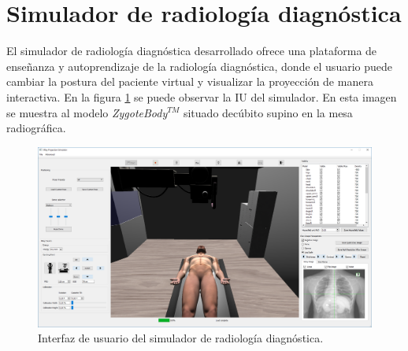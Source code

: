 \clearpage
\section{Simulador de radiología diagnóstica}
\label{result:xray}

El simulador de radiología diagnóstica desarrollado ofrece una plataforma de enseñanza y autoprendizaje de la radiología diagnóstica, donde el usuario puede cambiar la postura del paciente virtual y visualizar la proyección de manera interactiva. 
%
En la figura \ref{fig:simui} se puede observar la \ac{IU} del simulador. En esta imagen se muestra al modelo \emph{ZygoteBody}$^{TM}$ situado decúbito supino en la mesa radiográfica. 
\begin{figure}[h]
\centering
\includegraphics[width=0.95\linewidth]{IMG/simui.png}
\caption{\label{fig:simui} Interfaz de usuario del simulador de radiología diagnóstica. }
\end{figure}


